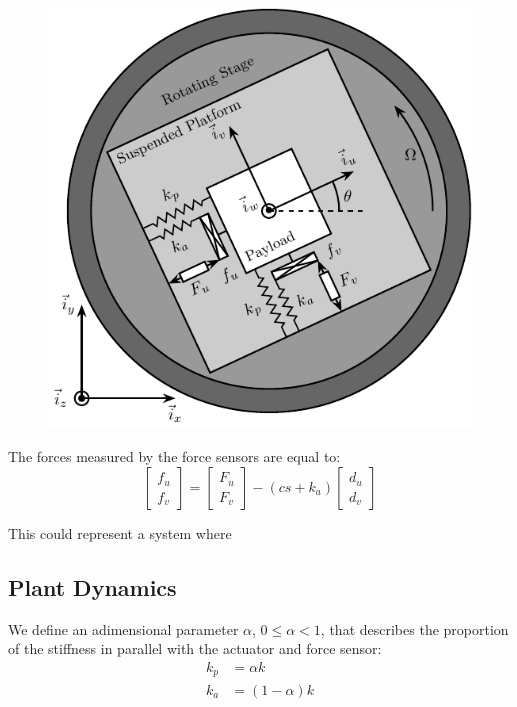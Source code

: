 \documentclass{ISMA_USD2020}
\begin{document}
\begin{figure}[htbp]
\centering
\includegraphics[scale=1]{figs/system_parallel_springs.pdf}
\label{fig:system_parallel_springs}
\end{figure}


The forces measured by the force sensors are equal to:
\begin{equation}
\label{eq:measured_force_kp}
  \begin{bmatrix} f_{u} \\ f_{v} \end{bmatrix} =
  \begin{bmatrix} F_u \\ F_v \end{bmatrix} - (c s + k_a)
  \begin{bmatrix} d_u \\ d_v \end{bmatrix}
\end{equation}

This could represent a system where

\subsection{Plant Dynamics}
\label{sec:orgc00a18e}

We define an adimensional parameter \(\alpha\), \(0 \le \alpha < 1\), that describes the proportion of the stiffness in parallel with the actuator and force sensor:
\begin{subequations}
  \begin{align}
    k_p &= \alpha k \\
    k_a &= (1 - \alpha) k
  \end{align}
\end{subequations}
\end{document}
